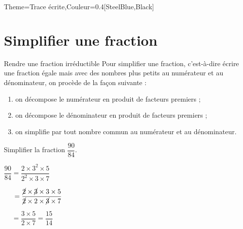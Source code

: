 \begin{Maquette}[Cours]{Theme={Trace écrite},Couleur={0.4[SteelBlue,Black]}}
\section{Simplifier une fraction}

   \begin{methode*}{Rendre une fraction irréductible}
      Pour simplifier une fraction, c'est-à-dire écrire une fraction égale mais avec des nombres plus petits au numérateur et au dénominateur, on procède de la façon suivante :
      \begin{enumerate}
         \item on décompose le numérateur en produit de facteurs premiers ;
         \item on décompose le dénominateur en produit de facteurs premiers ;
         \item on simplifie par tout nombre commun au numérateur et au dénominateur.
      \end{enumerate}
      \begin{exmethode}
         Simplifier la fraction $\dfrac{90}{84}$.
         \tcblower
              \; \parbox{3cm}{$\dfrac{90}{84} =\dfrac{2\times3^2\times5}{2^2\times3\times7}$ \par \medskip
            $\phantom{\dfrac{90}{84} }=\dfrac{\cancel{2}\times\cancel{3}\times3\times5}{\cancel{2}\times2\times\cancel{3}\times7}$ \par \medskip
            $\phantom{\dfrac{90}{84} }=\dfrac{3\times5}{2\times7} =\dfrac{15}{14}$}
      \end{exmethode}
   \end{methode*}

\end{Maquette}


